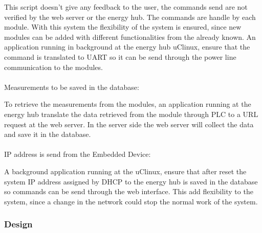 This script doesn't give any feedback to the user, the commands send are not verified by the web server or the energy hub. The commands are handle by each module. With this system the flexibility of the system is ensured, since new modules can be added with different functionalities from the already known.
An application running in background at the energy hub uClinux, ensure that the command is translated to UART so it can be send through the power line communication to the modules.
\\\\
Measurements to be saved in the database:
\begin{figure}[H]
	\begin{centering}
	\end{centering}
\end{figure}
To retrieve the measurements from the modules, an application running at the energy hub translate the data retrieved from the module through PLC to a URL request at the web server. In the server side the web server will collect the data and save it in the database.
\\\\
IP address is send from the Embedded Device:
\begin{figure}[H]
	\begin{centering}
		\missingfigure{Communication SendCmd.php}
	\end{centering}
\end{figure}
A background application running at the uClinux, ensure that after reset the system IP address assigned by DHCP to the energy hub is saved in the database so commands can be send through the web interface. This add flexibility to the system, since a change in the network could stop the normal work of the system.

\subsubsection{Design}
%
%
